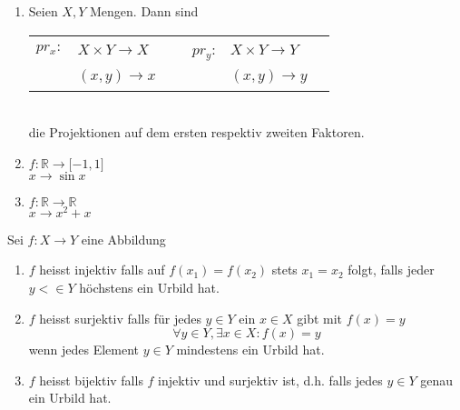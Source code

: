 \begin{enumerate}
\item Seien $X,Y$ Mengen. Dann sind \\
\begin{tabular}{r  l c r l c }
$pr_x:$ & $X\times Y\rightarrow X $& ~ & $pr_y$: & $X\times Y\rightarrow Y$ \\
~& $(x,y)\rightarrow x$ & ~& ~& $(x,y)\rightarrow y$ \\
\end{tabular}\\
die Projektionen auf dem ersten respektiv zweiten Faktoren. 
\item $f:\mathbb{R}\rightarrow\lbrack -1,1\rbrack$\\ $x\rightarrow \sin x$
\item $f:\mathbb{R}\rightarrow\mathbb{R}$\\
$x\rightarrow x^2+x$
\end{enumerate}
\begin{definition}{1.11}
Sei $f:X\rightarrow Y$ eine Abbildung
\begin{enumerate}
\item $f$ heisst injektiv falls auf $f(x_1)=f(x_2)$ stets $x_1=x_2$ folgt, falls jeder $y<\in Y$ höchstens ein Urbild hat.
\item $f$ heisst surjektiv falls für jedes $y\in Y$ ein $x\in X$ gibt mit $f(x)=y$ \[\forall y\in Y, \exists x\in X:f(x)=y\]wenn jedes Element $y\in Y$ mindestens ein Urbild hat. 
\item $f$ heisst bijektiv falls $f$ injektiv und surjektiv ist, d.h. falls jedes $y\in Y$ genau ein Urbild hat. 
\end{enumerate}
\end{definition}


